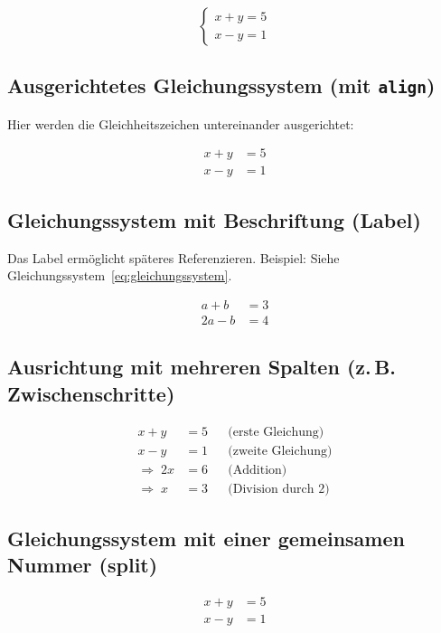 \documentclass[a4paper,12pt]{article}
\begin{document}
\[
\begin{cases}
x + y = 5 \\
x - y = 1
\end{cases}
\]

\subsection{Ausgerichtetes Gleichungssystem (mit \texttt{align})}

Hier werden die Gleichheitszeichen untereinander ausgerichtet:

\begin{align}
x + y &= 5 \\
x - y &= 1
\end{align}

\subsection{Gleichungssystem mit Beschriftung (Label)}

\noindent Das Label ermöglicht späteres Referenzieren.  
\noindent Beispiel: Siehe Gleichungssystem~\eqref{eq:gleichungssystem}.

\begin{align}
a + b &= 3 \\
2a - b &= 4
\label{eq:gleichungssystem}
\end{align}

\subsection{Ausrichtung mit mehreren Spalten (z.\,B. Zwischenschritte)}

\begin{align*}
x + y &= 5  && \text{(erste Gleichung)}\\
x - y &= 1  && \text{(zweite Gleichung)}\\
\Rightarrow\; 2x &= 6 && \text{(Addition)}\\
\Rightarrow\; x &= 3 && \text{(Division durch 2)}
\end{align*}

\subsection{Gleichungssystem mit einer gemeinsamen Nummer (split)}

\begin{equation}
\label{eq:split-system}
\begin{split}
x + y &= 5 \\
x - y &= 1
\end{split}
\end{equation}
\end{document}
